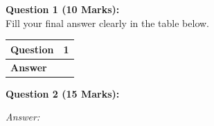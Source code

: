 
\noindent\textbf{Question 1 (10 Marks):}\\
Fill your final answer clearly in the table below.

\vspace{0.3cm}
\renewcommand{\arraystretch}{2.2}
\begin{tabularx}{\textwidth}{|p{2cm}|>{\centering\arraybackslash}X|}
\hline
\textbf{Question} & \textbf{1} \\ \hline
\textbf{Answer} & \\ \hline
\end{tabularx}

\vspace{0.8cm}

\noindent\textbf{Question 2 (15 Marks):}

\vspace{0.3cm}
\textit{Answer:}
\vspace*{10cm}